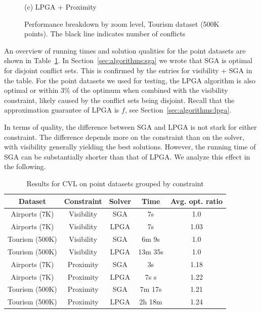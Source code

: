 \begin{figure}[tb]
\begin{minipage}{0.329\linewidth}
    \centerline{(c) LPGA + Proximity}
  \end{minipage}
  \vspace{-1ex}
  \caption{Performance breakdown by zoom level, Tourism dataset (500K points). The black line indicates number of conflicts} \label{fig:performance:tourism}
  \vspace{-2ex}
\end{figure}

An overview of running times and solution qualities for the point datasets are shown in Table~\ref{tab:points:overview}. In Section~\ref{sec:algorithms:sga} we wrote that SGA is optimal for disjoint conflict sets. This is confirmed by the entries for visibility + SGA in the table. For the point datasets we used for testing, the LPGA algorithm is also optimal or within $3\%$ of the optimum when combined with the visibility constraint, likely caused by the conflict sets being disjoint. Recall that the approximation guarantee of LPGA is $f$, see Section~\ref{sec:algorithms:lpga}.

In terms of quality, the difference between SGA and LPGA is not stark for either constraint. The difference depends more on the constraint than on the solver, with visibility generally yielding the best solutions. However, the running time of SGA can be substantially shorter than that of LPGA. We analyze this effect in the following.

\begin{table}[htdp]
\vspace{-1ex}
\caption{Results for CVL on point datasets grouped by constraint}
\vspace{-2ex}
\begin{center}
\begin{tabular}{|c|c|c|c|c|}
\hline
\textbf{Dataset} & \textbf{Constraint} & \textbf{Solver} & \textbf{Time} & \textbf{Avg. opt. ratio}\\ 
\hline
Airports (7K) & Visibility & SGA & 7s & 1.0 \\
Airports (7K) & Visibility & LPGA & 7s & 1.03 \\
Tourism (500K) & Visibility & SGA & 6m 9s & 1.0 \\
Tourism (500K) & Visibility & LPGA & 13m 35s & 1.0 \\
\hline
Airports (7K)  & Proximity  & SGA & 3s & 1.18 \\
Airports (7K)  & Proximity & LPGA & 7s s & 1.22 \\
Tourism (500K) & Proximity & SGA & 7m 17s & 1.21 \\
Tourism (500K) & Proximity & LPGA & 2h 18m & 1.24 \\
\hline
\end{tabular}
\end{center}
\label{tab:points:overview}
\vspace{-2ex}
\end{table}%

